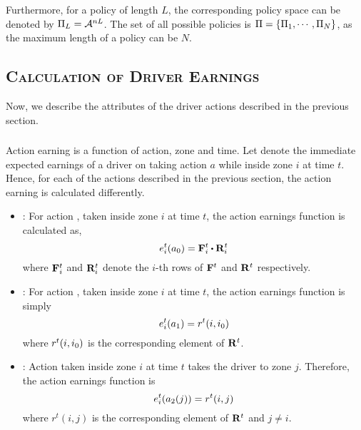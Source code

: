 Furthermore, for a policy of length $L$, the corresponding policy space can be denoted by
$\Pi_L = \mathcal{A}^{nL}$. The set of all possible policies is $\Pi = \{\Pi_1, \cdots, \Pi_N\}$, as the maximum length of a policy can be $N$.


\subsection{\textsc{Calculation of Driver Earnings}}
Now, we describe the attributes of the driver actions described in the previous section.

\subsubsection{}

Action earning is a function of action, zone and time. Let {} denote the immediate expected earnings of a driver 
on taking action $a$ while inside zone $i$ at time $t$. Hence, for each of the actions described in the previous section, the
action earning is calculated differently.

\begin{itemize}
	\item {\getpassenger} : For action {\getpassengeraction}, taken inside zone $i$ at time $t$, the action earnings function
	is calculated as,
	\begin{equation}
	\actionearning{i}{t}{a_0} = \empiricaltransitionmatrix_{i}^{t} \bigcdot \rewardsmatrix_{i}^{t}
	\end{equation}
	where ${\mathbf{F}}_{i}^{t}$ and ${\mathbf{R}}_{i}^{t}$ denote the $i$-th rows of ${\mathbf{F}}^{t}$ and ${\mathbf{R}}^{t}$ respectively. \\

	\item {\gohome} : For action {\gohomeaction}, taken inside zone $i$ at time $t$, the action earnings function is simply
	\begin{equation}
	e_{i}^{t}({a_1}) = r^t(i,{i_0})
	\end{equation}
	where $r^t(i,{i_0})$ is the corresponding element of ${\mathbf{R}}^{t}$. \\

	\item {\relocate} : Action {\relocateaction} taken inside zone $i$ at time $t$ takes the driver to zone $j$. Therefore, the action earnings function is
	\begin{equation}
	e_{i}^{t}({a_2(j)}) = r^t(i,j)
	\end{equation}
	where $r^t(i,j)$ is the corresponding element of ${\mathbf{R}}^{t}$ and $j \neq i$. \\
\end{itemize}

